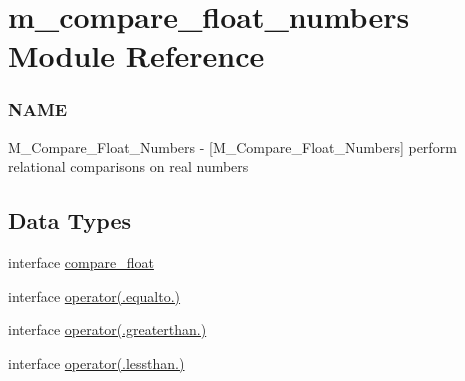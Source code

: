 \hypertarget{namespacem__compare__float__numbers}{}\section{m\+\_\+compare\+\_\+float\+\_\+numbers Module Reference}
\label{namespacem__compare__float__numbers}


\subsubsection*{N\+A\+ME}

M\+\_\+\+Compare\+\_\+\+Float\+\_\+\+Numbers -\/ \mbox{[}M\+\_\+\+Compare\+\_\+\+Float\+\_\+\+Numbers\mbox{]} perform relational comparisons on real numbers  


\subsection*{Data Types}
\begin{DoxyCompactItemize}
\item 
interface \hyperlink{interfacem__compare__float__numbers_1_1compare__float}{compare\+\_\+float}
\item 
interface \hyperlink{interfacem__compare__float__numbers_1_1operator_07_8equalto_8_08}{operator(.\+equalto.)}
\item 
interface \hyperlink{interfacem__compare__float__numbers_1_1operator_07_8greaterthan_8_08}{operator(.\+greaterthan.)}
\item 
interface \hyperlink{interfacem__compare__float__numbers_1_1operator_07_8lessthan_8_08}{operator(.\+lessthan.)}
\end{DoxyCompactItemize}
